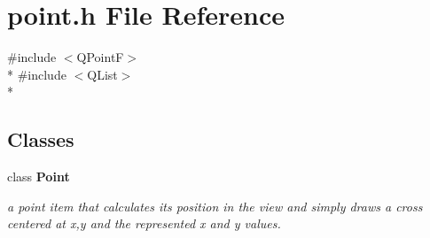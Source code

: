 \section{point.\+h File Reference}
\label{bk3_2curve_2point_8h}
{\ttfamily \#include $<$Q\+PointF$>$}\\*
{\ttfamily \#include $<$Q\+List$>$}\\*
\subsection*{Classes}
\begin{DoxyCompactItemize}
\item 
class {\bf Point}
\begin{DoxyCompactList}\small\item\em a point item that calculates its position in the view and simply draws a cross centered at x,y and the represented x and y values. \end{DoxyCompactList}\end{DoxyCompactItemize}
